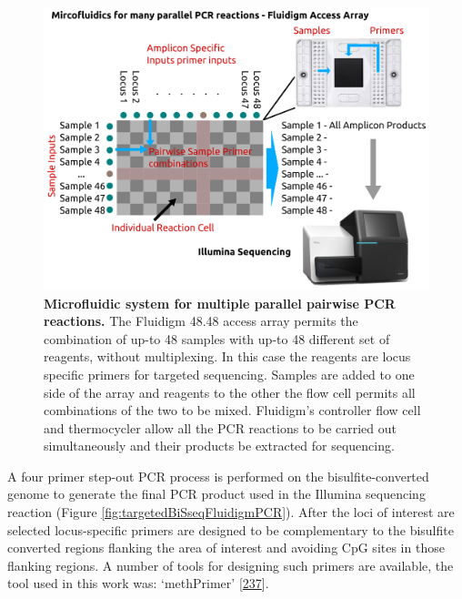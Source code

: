 \documentclass[
]{book}
\begin{document}
\begin{figure}

{\centering \includegraphics[width=0.6\linewidth]{figs/targeted_BiSseq_fluidigm_generic} 

}

\caption{\textbf{Microfluidic system for multiple parallel pairwise PCR reactions.} The Fluidigm 48.48 access array permits the combination of up-to 48 samples with up-to 48 different set of reagents, without multiplexing. In this case the reagents are locus specific primers for targeted sequencing. Samples are added to one side of the array and reagents to the other the flow cell permits all combinations of the two to be mixed. Fluidigm's controller flow cell and thermocycler allow all the PCR reactions to be carried out simultaneously and their products be extracted for sequencing.}\label{fig:targetedBiSseqFluidigmGeneric}
\end{figure}



A four primer step-out PCR process is performed on the bisulfite-converted genome to generate the final PCR product used in the Illumina sequencing reaction (Figure \ref{fig:targetedBiSseqFluidigmPCR}).
After the loci of interest are selected locus-specific primers are designed to be complementary to the bisulfite converted regions flanking the area of interest and avoiding CpG sites in those flanking regions.
A number of tools for designing such primers are available, the tool used in this work was: `methPrimer' {[}\protect\hyperlink{ref-Li2002}{237}{]}.
\end{document}
